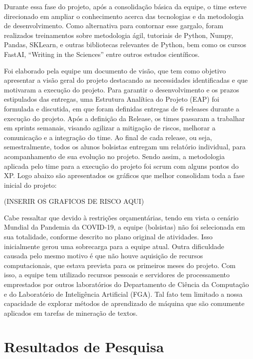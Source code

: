 \documentclass[12pt]{article}
\begin{document}
Durante essa fase do projeto, após a consolidação básica da equipe, o time esteve direcionado em ampliar o conhecimento acerca das tecnologias e da metodologia de desenvolvimento. Como alternativa para contornar esse gargalo, foram realizados treinamentos sobre metodologia ágil, tutoriais de Python, Numpy, Pandas, SKLearn, e outras bibliotecas relevantes de Python, bem como os cursos FastAI, ``Writing in the Sciences'' entre outros estudos científicos.

Foi elaborado pela equipe um documento de visão, que tem como objetivo apresentar a visão geral do projeto destacando as necessidades identiﬁcadas e que motivaram a execução do projeto.
Para garantir o desenvolvimento e os prazos estipulados das entregas, uma Estrutura Analítica do Projeto (EAP) foi formulada e discutida, em que foram definidas entregas de 6 releases durante a execução do projeto. Após a definição da Release, os times passaram a trabalhar em sprints semanais, visando agilizar a mitigação de riscos, melhorar a comunicação e a integração do time. Ao final de cada release, ou seja, semestralmente, todos os alunos bolsistas entregam um relatório individual, para acompanhamento de sua evolução no projeto. Sendo assim, a metodologia aplicada pelo time para a execução do projeto foi scrum com alguns pontos do XP. Logo abaixo são apresentados os gráficos que melhor consolidam toda a fase inicial do projeto:


(INSERIR OS GRAFICOS DE RISCO AQUI)


Cabe ressaltar que devido à restrições orçamentárias, tendo em vista o cenário Mundial da Pandemia da COVID-19,  a equipe (bolsistas) não foi selecionada em sua totalidade, conforme descrito no plano original de atividades. Isso inicialmente gerou uma sobrecarga para a equipe atual. Outra dificuldade causada pelo mesmo motivo é que não houve aquisição de recursos computacionais, que estava prevista para os primeiros meses do projeto. Com isso, a equipe tem utilizado recursos pessoais e servidores de processamento emprestados por outros laboratórios do Departamento de Ciência da Computação e do Laboratório de Inteligência Artificial (FGA). Tal fato tem limitado a nossa capacidade de explorar métodos de aprendizado de máquina que são comumente aplicados em tarefas de mineração de textos.


\section{Resultados de Pesquisa}
\label{sec:resultados}
\end{document}

